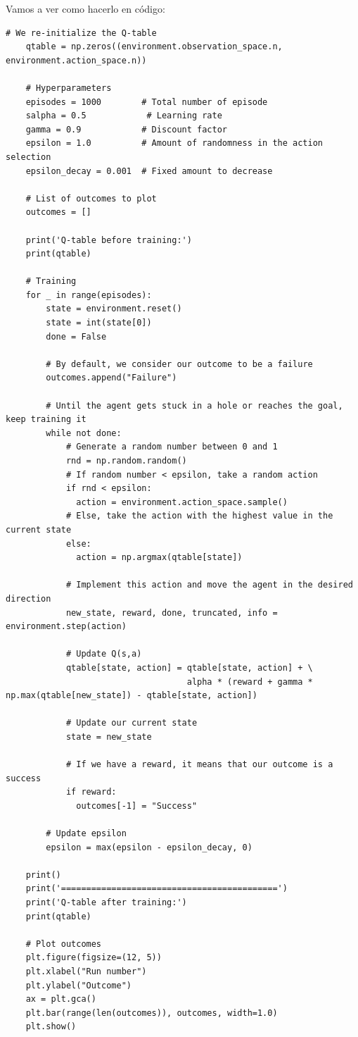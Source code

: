 \documentclass{article}
\begin{document}
\vspace{0.5cm}

Vamos a ver como hacerlo en código:

\vspace{0.5cm}

\begin{lstlisting}[style=mystyle]
    # We re-initialize the Q-table
    qtable = np.zeros((environment.observation_space.n, environment.action_space.n))
    
    # Hyperparameters
    episodes = 1000        # Total number of episode
    salpha = 0.5            # Learning rate
    gamma = 0.9            # Discount factor
    epsilon = 1.0          # Amount of randomness in the action selection
    epsilon_decay = 0.001  # Fixed amount to decrease
    
    # List of outcomes to plot
    outcomes = []
    
    print('Q-table before training:')
    print(qtable)
    
    # Training
    for _ in range(episodes):
        state = environment.reset()
        state = int(state[0])
        done = False
    
        # By default, we consider our outcome to be a failure
        outcomes.append("Failure")
        
        # Until the agent gets stuck in a hole or reaches the goal, keep training it
        while not done:
            # Generate a random number between 0 and 1
            rnd = np.random.random()
            # If random number < epsilon, take a random action
            if rnd < epsilon:
              action = environment.action_space.sample()
            # Else, take the action with the highest value in the current state
            else:
              action = np.argmax(qtable[state])
            
            # Implement this action and move the agent in the desired direction
            new_state, reward, done, truncated, info = environment.step(action)
    
            # Update Q(s,a)
            qtable[state, action] = qtable[state, action] + \
                                    alpha * (reward + gamma * np.max(qtable[new_state]) - qtable[state, action])
            
            # Update our current state
            state = new_state
    
            # If we have a reward, it means that our outcome is a success
            if reward:
              outcomes[-1] = "Success"
    
        # Update epsilon
        epsilon = max(epsilon - epsilon_decay, 0)
    
    print()
    print('===========================================')
    print('Q-table after training:')
    print(qtable)
    
    # Plot outcomes
    plt.figure(figsize=(12, 5))
    plt.xlabel("Run number")
    plt.ylabel("Outcome")
    ax = plt.gca()
    plt.bar(range(len(outcomes)), outcomes, width=1.0)
    plt.show()
\end{lstlisting}
\end{document}
